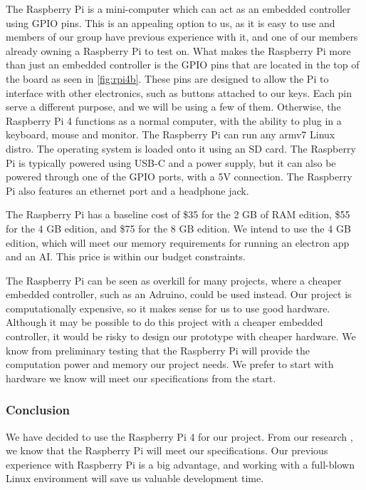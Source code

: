 The Raspberry Pi is a mini-computer which can act as an embedded controller using GPIO
pins. This is an appealing option to us, as it is easy to use and members of our group
have previous experience with it, and one of our members already owning a Raspberry Pi to
test on. What makes the Raspberry Pi more than just an embedded controller is the GPIO
pins that are located in the top of the board as seen in \autoref{fig:rpi4b}. These pins
are designed to allow the Pi to interface with other electronics, such as buttons attached
to our keys. Each pin serve a different purpose, and we will be using a few of them.
Otherwise, the Raspberry Pi 4 functions as a normal computer, with the ability to plug in
a keyboard, mouse and monitor. The Raspberry Pi can run any armv7 Linux distro. The
operating system is loaded onto it using an SD card. The Raspberry Pi is typically powered
using USB-C and a power supply, but it can also be powered through one of the GPIO ports,
with a 5V connection. The Raspberry Pi also features an ethernet port and a headphone
jack.

The Raspberry Pi has a baseline cost of \$35 for the 2 GB of RAM edition, \$55 for the 4
GB edition, and \$75 for the 8 GB edition. We intend to use the 4 GB edition, which will
meet our memory requirements for running an electron app and an AI. This price is within
our budget constraints.

The Raspberry Pi can be seen as overkill for many projects, where a cheaper embedded
controller, such as an Adruino, could be used instead. Our project is computationally
expensive, so it makes sense for us to use good hardware. Although it may be possible to
do this project with a cheaper embedded controller, it would be risky to design our
prototype with cheaper hardware. We know from preliminary testing that the Raspberry Pi
will provide the computation power and memory our project needs. We prefer to start with
hardware we know will meet our specifications from the start.

\subsubsection{Conclusion}

We have decided to use the Raspberry Pi 4 for our project. From our research , we know
that the Raspberry Pi will meet our specifications. Our previous experience with Raspberry
Pi is a big advantage, and working with a full-blown Linux environment will save us
valuable development time.


